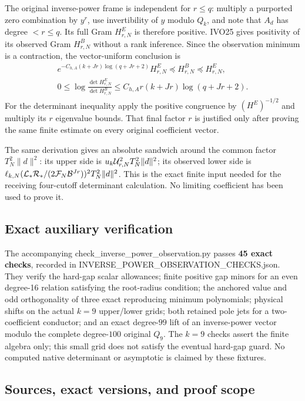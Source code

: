 \documentclass[11pt]{article}
\begin{document}
The original inverse-power frame is independent for \(r\le q\): multiply a purported zero combination by \(y^r\), use invertibility of \(y\) modulo \(Q_k\), and note that \(A_d\) has degree \(<r\le q\). Its full Gram \(H^E_{r,N}\) is therefore positive. IVO25 gives positivity of its observed Gram \(H^B_{r,N}\) without a rank inference. Since the observation minimum is a contraction, the vector-uniform conclusion is \[
\boxed{\begin{gathered}
e^{-C_{h,A}(k+Jr)\log(q+Jr+2)}H^E_{r,N}
\preceq H^B_{r,N}\preceq H^E_{r,N},\\
0\le\log\frac{\det H^E_{r,N}}{\det H^B_{r,N}}
\le C_{h,A}r(k+Jr)\log(q+Jr+2).\end{gathered}
}\tag{IVO26}
\] For the determinant inequality apply the positive congruence by \((H^E)^{-1/2}\) and multiply its \(r\) eigenvalue bounds. That final factor \(r\) is justified only after proving the same finite estimate on every original coefficient vector.

The same derivation gives an absolute sandwich around the common factor \(T_N^2\|d\|^2\): its upper side is \(u_k{\cal U}_{r,N}^2T_N^2\|d\|^2\); its observed lower side is \(\ell_{k,N}({\cal L}_*{\cal R}_*/(2{\cal F}_N{\cal B}^{Jr}))^2T_N^2\|d\|^2\). This is the exact finite input needed for the receiving four-cutoff determinant calculation. No limiting coefficient has been used to prove it.

\subsection{Exact auxiliary verification}\label{exact-auxiliary-verification}

The accompanying check\_inverse\_power\_observation.py passes \textbf{45 exact checks}, recorded in INVERSE\_POWER\_OBSERVATION\_CHECKS.json. They verify the hard-gap scalar allowances; finite positive gap minors for an even degree-16 relation satisfying the root-radius condition; the anchored value and odd orthogonality of three exact reproducing minimum polynomials; physical shifts on the actual \(k=9\) upper/lower grids; both retained pole jets for a two-coefficient conductor; and an exact degree-\(99\) lift of an inverse-power vector modulo the complete degree-\(100\) original \(Q_9\). The \(k=9\) checks assert the finite algebra only; this small grid does not satisfy the eventual hard-gap guard. No computed native determinant or asymptotic is claimed by these fixtures.

\subsection{Sources, exact versions, and proof scope}\label{sources-exact-versions-and-proof-scope}
\end{document}
